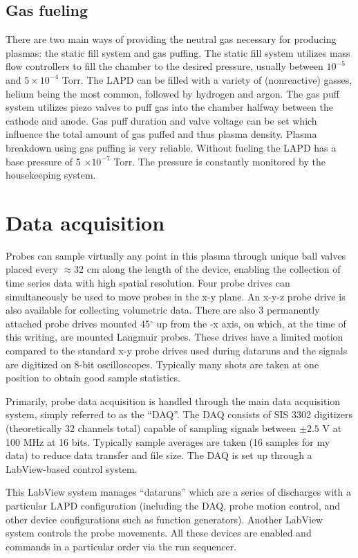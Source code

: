 \subsection{Gas fueling}
There are two main ways of providing the neutral gas necessary for producing plasmas: the static fill system and gas puffing. The static fill system utilizes mass flow controllers to fill the chamber to the desired pressure, usually between $10^{-5}$ and $5 \times 10^{-4}$ Torr. The LAPD can be filled with a variety of (nonreactive) gasses, helium being the most common, followed by hydrogen and argon. The gas puff system utilizes piezo valves to puff gas into the chamber halfway between the cathode and anode. Gas puff duration and valve voltage can be set which influence the total amount of gas puffed and thus plasma density. Plasma  breakdown using gas puffing is very reliable. Without fueling the LAPD has a base pressure of 5 $\times 10^{-7}$ Torr. The pressure is constantly monitored by the housekeeping system. 

\section{Data acquisition}

Probes can sample virtually any point in this plasma through unique ball valves placed every $\approx$32 cm along the length of the device, enabling the collection of time series data with high spatial resolution. Four probe drives can simultaneously be used to move probes in the x-y plane. An x-y-z probe drive is also available for collecting volumetric data. There are also 3 permanently attached probe drives mounted 45$^\circ$ up from the -x axis, on which, at the time of this writing, are mounted Langmuir probes. These drives have a limited motion compared to the standard x-y probe drives used during dataruns and the signals are digitized on 8-bit oscilloscopes. Typically many shots are taken at one position to obtain good sample statistics.

Primarily, probe data acquisition is handled through the main data acquisition system, simply referred to as the ``DAQ''. The DAQ consists of SIS 3302 digitizers (theoretically 32 channels total) capable of sampling signals between $\pm 2.5$ V at 100 MHz at 16 bits. Typically sample averages are taken (16 samples for my data) to reduce data transfer and file size. The DAQ is set up through a LabView-based control system. 

This LabView system manages ``dataruns'' which are a series of discharges with a particular LAPD configuration (including the DAQ, probe motion control, and other device configurations such as function generators). Another LabView system controls the probe movements. All these devices are enabled and commands in a particular order via the run sequencer. 

